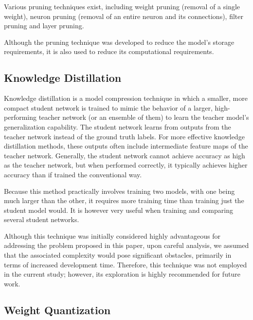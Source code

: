 Various pruning techniques exist, including weight pruning (removal of a single
weight), neuron pruning (removal of an entire neuron and its connections),
filter pruning and layer pruning.

Although the pruning technique was developed to reduce the model's storage
requirements, it is also used to reduce its computational requirements.



\subsection{Knowledge Distillation}

Knowledge distillation is a model compression technique in which a smaller, more
compact student network is trained to mimic the behavior of a larger,
high-performing teacher network (or an ensemble of them) to learn the teacher
model's generalization capability. The student network learns from outputs from
the teacher network instead of the ground truth labels. For more effective
knowledge distillation methods, these outputs often include intermediate feature
maps of the teacher network. Generally, the student network cannot achieve
accuracy as high as the teacher network, but when performed correctly, it
typically achieves higher accuracy than if trained the conventional way.


Because this method practically involves training two models, with one being
much larger than the other, it requires more training time than training just
the student model would. It is however very useful when training and comparing
several student networks.

Although this technique was initially considered highly advantageous for
addressing the problem proposed in this paper, upon careful analysis, we assumed
that the associated complexity would pose significant obstacles, primarily in
terms of increased development time. Therefore, this technique was not employed
in the current study; however, its exploration is highly recommended for future work.


\subsection{Weight Quantization}


